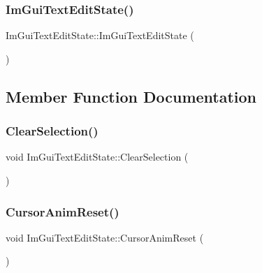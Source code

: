 \subsubsection{\texorpdfstring{Im\+Gui\+Text\+Edit\+State()}{ImGuiTextEditState()}}
{\footnotesize\ttfamily Im\+Gui\+Text\+Edit\+State\+::\+Im\+Gui\+Text\+Edit\+State (\begin{DoxyParamCaption}{ }\end{DoxyParamCaption})}



\subsection{Member Function Documentation}
\hypertarget{struct_im_gui_text_edit_state_ae753eb90c3bb7954dfc1e7fd0fef4460}{}\label{struct_im_gui_text_edit_state_ae753eb90c3bb7954dfc1e7fd0fef4460} 
\subsubsection{\texorpdfstring{Clear\+Selection()}{ClearSelection()}}
{\footnotesize\ttfamily void Im\+Gui\+Text\+Edit\+State\+::\+Clear\+Selection (\begin{DoxyParamCaption}{ }\end{DoxyParamCaption})}

\hypertarget{struct_im_gui_text_edit_state_abed49497339d5242f42d86193a2c683e}{}\label{struct_im_gui_text_edit_state_abed49497339d5242f42d86193a2c683e} 
\subsubsection{\texorpdfstring{Cursor\+Anim\+Reset()}{CursorAnimReset()}}
{\footnotesize\ttfamily void Im\+Gui\+Text\+Edit\+State\+::\+Cursor\+Anim\+Reset (\begin{DoxyParamCaption}{ }\end{DoxyParamCaption})}

\hypertarget{struct_im_gui_text_edit_state_ac6f8184c63c826dfc9bc2a47ba57b80c}{}\label{struct_im_gui_text_edit_state_ac6f8184c63c826dfc9bc2a47ba57b80c} 
